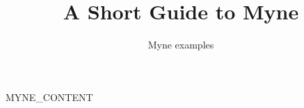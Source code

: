 \documentclass{report}
\title{A Short Guide to Myne}
\author{Myne examples}
\date{}
{{MYNE_THEOREM_SETUP}}
\begin{document}
\maketitle
{{MYNE_CONTENT}}


\end{document}
